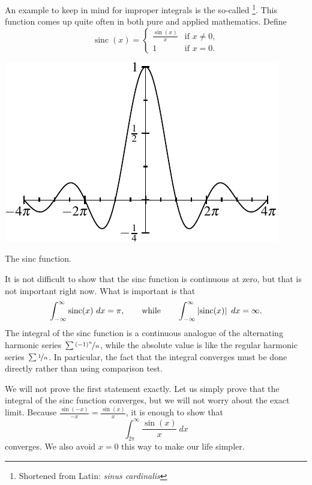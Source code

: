 \begin{example}
An example to keep in mind for improper integrals
is the so-called \emph{}%
\footnote{Shortened from Latin: \emph{sinus cardinalis}}.
This function comes up quite often
in both pure and applied mathematics.  Define
\begin{equation*}
\operatorname{sinc}(x) =
\begin{cases}
\frac{\sin(x)}{x} & \text{if $x \not= 0$} , \\
1 & \text{if $x = 0$} .
\end{cases}
\end{equation*}
\begin{myfigureht}
\includegraphics{figures/sincfig}
\caption{The sinc function.
\label{figsinc}}
\end{myfigureht}

It is not difficult to show that
the sinc function is continuous at zero, but that is
not important right now.  What is important is that
\begin{equation*}
\int_{-\infty}^\infty \operatorname{sinc}(x) ~dx = \pi ,
\qquad \text{while} \qquad
\int_{-\infty}^\infty \left\lvert {\operatorname{sinc}(x)} \right\rvert ~dx = \infty .
\end{equation*}
The integral of the sinc function is a continuous analogue of the
alternating harmonic series $\sum \nicefrac{{(-1)}^n}{n}$, while the
absolute value is like the regular harmonic series $\sum \nicefrac{1}{n}$.
In particular, the fact that the integral converges must be done directly
rather than using comparison test.

We will not prove the first statement exactly.  Let us simply prove
that the integral of the sinc function converges, but we will not worry
about the exact limit.  Because $\frac{\sin(-x)}{-x} = \frac{\sin(x)}{x}$, it is
enough to show that
\begin{equation*}
\int_{2\pi}^\infty \frac{\sin(x)}{x}~dx
\end{equation*}
converges.  We
also avoid $x=0$ this way to make our life simpler.


\end{example}
